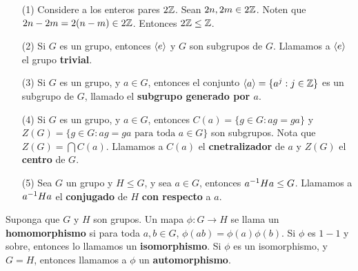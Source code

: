 \begin{example}\label{example_4}
    \begin{enumerate}
        \item[(1)] Considere a los enteros pares $2\mathbb{Z}$. Sean  $2n,2m \in 2\mathbb{Z}$.
            Noten que $2n-2m=2(n-m) \in 2\mathbb{Z}$. Entonces $2\mathbb{Z} \leq \mathbb{Z}$.

        \item[(2)] Si $G$ es un grupo, entonces  $\langle e\rangle$ y $G$ son
            subgrupos de  $G$. Llamamos a $\langle e\rangle$ el grupo
            \textbf{trivial}.

        \item[(3)] Si $G$ es un grupo, y  $a \in G$, entonces el conjunto
            $\langle a\rangle=\{a^j : j \in \mathbb{Z}\}$ es un subgrupo de $G$, llamado el
            \textbf{subgrupo generado por $a$}.

        \item[(4)] Si $G$ es un grupo, y  $a \in G$, entonces  $C(a)=\{g \in G :
            ag=ga\}$ y $Z(G)=\{g \in G : ag=ga \text{ para toda } a \in G\}$ son
            subgrupos. Nota que $Z(G)=\bigcap{C(a)}$. Llamamos a $C(a)$ el
            \textbf{cnetralizador} de $a$ y  $Z(G)$ el \textbf{centro} de $G$.

        \item[(5)] Sea $G$ un grupo y  $H \leq G$, y sea  $a \in G$, entonces
        $a^{-1}Ha \leq G$. Llamamos a $a^{-1}Ha$ el \textbf{conjugado} de $H$
         \textbf{con respecto} a $a$.
    \end{enumerate}
\end{example}

\begin{definition}
    Suponga que $G$ y  $H$ son grupos. Un mapa  $\phi:G \rightarrow H$ se llama
    un \textbf{homomorphismo} si para toda $a,b \in G$,
    $\phi(ab)=\phi(a)\phi(b)$. Si $\phi$ es  $1-1$ y sobre, entonces lo llamamos
    un  \textbf{isomorphismo}. Si $\phi$ es un isomorphismo, y  $G=H$, entonces
    llamamos a  $\phi$ un  \textbf{automorphismo}.
\end{definition}
